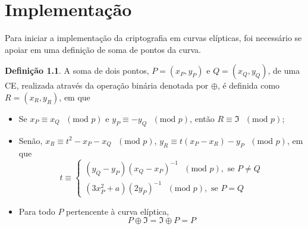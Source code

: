 \documentclass[14pt, oneside]{book}
\newcommand\tab[1][1cm]{\hspace*{#1}}
\theoremstyle{definition}
\newtheorem{defn}{Definição}
\begin{document}
        \chapter{Implementação}
            \tab Para iniciar a implementação da criptografia em curvas elípticas, foi necessário se apoiar em uma definição de soma de pontos da curva.
            \begin{defn}
            A soma de dois pontos, $P = (x_P , y_P )\textrm{ e } Q = (x_Q , y_Q )$, de uma CE, realizada através da operação binária denotada por $\oplus$, é definida como $R = (x_R , y_R )$, em que
            \begin{itemize}
                \item Se $x_P \equiv x_Q\textrm{ }(\textrm{mod }p)$ e $y_P \equiv -y_Q\textrm{ }(\textrm{mod }p)$, então $R \equiv \Im\textrm{ }(\textrm{mod }p)$;
                \item Senão, $x_R \equiv t^2 - x_P - x_Q\textrm{ }(\textrm{mod }p) $, $y_R \equiv t(x_P - x_R ) - y_P\textrm{ }(\textrm{mod }p)$, em que
                    $$t \equiv 
                    \begin{cases} 
                    (y_Q-y_P)(x_Q-x_P)^{-1}\textrm{ }(\textrm{mod }p),\textrm{ se }P\neq Q \\
                    (3x_P^2+a)(2y_P)^{-1}\textrm{ }(\textrm{mod }p),\textrm{ se }P=Q
                    \end{cases}$$
                    
                \item Para todo $P$ pertencente à curva elíptica,
                $$P \oplus \Im = \Im \oplus P = P$$
            \end{itemize}
            \end{defn}
            
\end{document}
